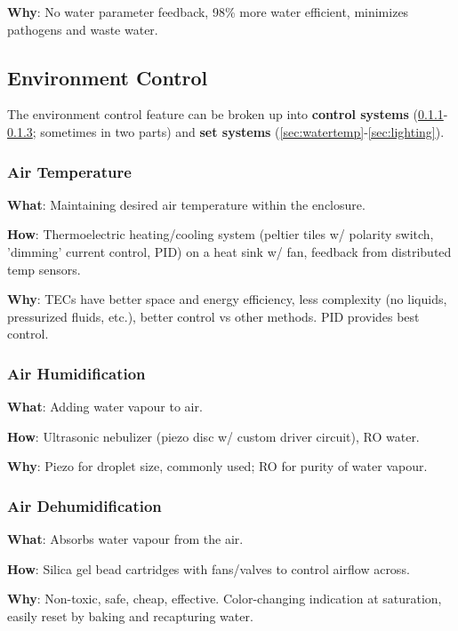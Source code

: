 \documentclass{report}
\begin{document}
\textbf{Why}: No water parameter feedback, 98\% more water efficient, minimizes pathogens and waste water.

\subsection{Environment Control}
\label{sec:environment}

The environment control feature can be broken up into \textbf{control systems} (\ref{sec:airtemp}-\ref{sec:dehum}; sometimes in two parts) and \textbf{set systems} (\ref{sec:watertemp}-\ref{sec:lighting}).

\subsubsection{Air Temperature}
\label{sec:airtemp}

\textbf{What}: Maintaining desired air temperature within the enclosure.

\textbf{How}: Thermoelectric heating/cooling system (peltier tiles w/ polarity switch, 'dimming' current control, PID) on a heat sink w/ fan, feedback from distributed temp sensors.

\textbf{Why}: TECs have better space and energy efficiency, less complexity (no liquids, pressurized fluids, etc.), better control vs other methods. PID provides best control.

\newpage

\subsubsection{Air Humidification}
\label{sec:airhum}

\textbf{What}: Adding water vapour to air.

\textbf{How}: Ultrasonic nebulizer (piezo disc w/ custom driver circuit), RO water.

\textbf{Why}: Piezo for droplet size, commonly used; RO for purity of water vapour.

\subsubsection{Air Dehumidification}
\label{sec:dehum}

\textbf{What}: Absorbs water vapour from the air.

\textbf{How}: Silica gel bead cartridges with fans/valves to control airflow across.

\textbf{Why}: Non-toxic, safe, cheap, effective. Color-changing indication at saturation, easily reset by baking and recapturing water.
\end{document}
